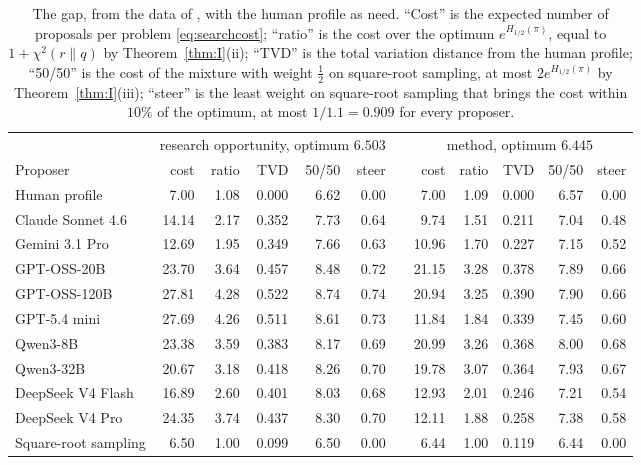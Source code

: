 \begin{table}[t]
\caption{The gap, from the data of \cite{CZC26}, with the human profile as need. ``Cost'' is the expected number of proposals per problem \eqref{eq:searchcost}; ``ratio'' is the cost over the optimum $e^{H_{1/2}(\pi)}$, equal to $1+\chi^{2}(r\|q)$ by Theorem~\ref{thm:I}(ii); ``TVD'' is the total variation distance from the human profile; ``50/50'' is the cost of the mixture with weight $\frac12$ on square-root sampling, at most $2e^{H_{1/2}(\pi)}$ by Theorem~\ref{thm:I}(iii); ``steer'' is the least weight on square-root sampling that brings the cost within $10\%$ of the optimum, at most $1/1.1=0.909$ for every proposer.}
\label{tab:gap}
\centering
\footnotesize
\setlength{\tabcolsep}{4.5pt}
\begin{tabular}{@{}l rrrrr c rrrrr@{}}
\toprule
 & \multicolumn{5}{c}{research opportunity, optimum $6.503$} && \multicolumn{5}{c}{method, optimum $6.445$} \\
\cmidrule{2-6}\cmidrule{8-12}
Proposer & cost & ratio & TVD & 50/50 & steer && cost & ratio & TVD & 50/50 & steer \\
\midrule
Human profile & 7.00 & 1.08 & 0.000 & 6.62 & 0.00 && 7.00 & 1.09 & 0.000 & 6.57 & 0.00 \\
Claude Sonnet 4.6 & 14.14 & 2.17 & 0.352 & 7.73 & 0.64 && 9.74 & 1.51 & 0.211 & 7.04 & 0.48 \\
Gemini 3.1 Pro & 12.69 & 1.95 & 0.349 & 7.66 & 0.63 && 10.96 & 1.70 & 0.227 & 7.15 & 0.52 \\
GPT-OSS-20B & 23.70 & 3.64 & 0.457 & 8.48 & 0.72 && 21.15 & 3.28 & 0.378 & 7.89 & 0.66 \\
GPT-OSS-120B & 27.81 & 4.28 & 0.522 & 8.74 & 0.74 && 20.94 & 3.25 & 0.390 & 7.90 & 0.66 \\
GPT-5.4 mini & 27.69 & 4.26 & 0.511 & 8.61 & 0.73 && 11.84 & 1.84 & 0.339 & 7.45 & 0.60 \\
Qwen3-8B & 23.38 & 3.59 & 0.383 & 8.17 & 0.69 && 20.99 & 3.26 & 0.368 & 8.00 & 0.68 \\
Qwen3-32B & 20.67 & 3.18 & 0.418 & 8.26 & 0.70 && 19.78 & 3.07 & 0.364 & 7.93 & 0.67 \\
DeepSeek V4 Flash & 16.89 & 2.60 & 0.401 & 8.03 & 0.68 && 12.93 & 2.01 & 0.246 & 7.21 & 0.54 \\
DeepSeek V4 Pro & 24.35 & 3.74 & 0.437 & 8.30 & 0.70 && 12.11 & 1.88 & 0.258 & 7.38 & 0.58 \\
Square-root sampling & 6.50 & 1.00 & 0.099 & 6.50 & 0.00 && 6.44 & 1.00 & 0.119 & 6.44 & 0.00 \\
\bottomrule
\end{tabular}
\end{table}

